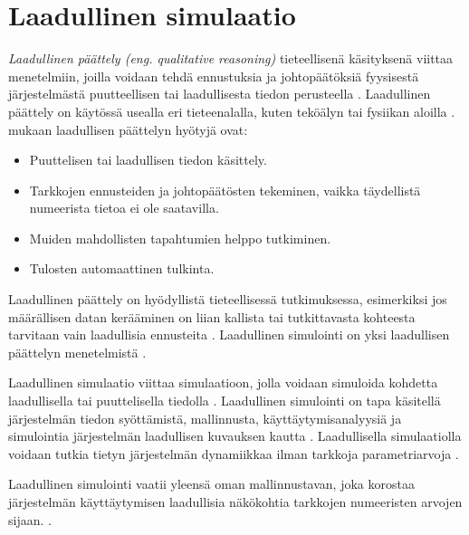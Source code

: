 \documentclass[utf8]{gradu3}
\begin{document}
\section{Laadullinen simulaatio} \label{laadullinen simulaatio}
\textit{Laadullinen päättely (eng. qualitative reasoning)} 
tieteellisenä käsityksenä viittaa menetelmiin, joilla
voidaan tehdä ennustuksia ja johtopäätöksiä fyysisestä järjestelmästä puutteellisen tai laadullisesta tiedon perusteella
\parencite{QualitativeReasoning1997}. 
Laadullinen päättely on käytössä usealla eri tieteenalalla, kuten teköälyn \parencite[luku~35]{qualitativeReasoning2014} tai fysiikan aloilla \parencite{QualitativePhysics1988}.
\textcite{QualitativeReasoning1997} mukaan laadullisen päättelyn hyötyjä ovat:
\begin{itemize}
    \item Puuttelisen tai laadullisen tiedon käsittely.
    \item Tarkkojen ennusteiden ja johtopäätösten tekeminen, 
    vaikka täydellistä numeerista tietoa ei ole saatavilla.
    \item Muiden mahdollisten tapahtumien helppo tutkiminen.
    \item Tulosten automaattinen tulkinta. 
\end{itemize}
Laadullinen päättely on hyödyllistä tieteellisessä tutkimuksessa, esimerkiksi jos 
määrällisen datan kerääminen on liian kallista tai 
tutkittavasta kohteesta tarvitaan vain laadullisia ennusteita
\parencite{QualitativeReasoning1997}.
Laadullinen simulointi on yksi laadullisen päättelyn menetelmistä \parencite{kuipers1986qualitative}. 

Laadullinen simulaatio viittaa simulaatioon, jolla voidaan simuloida kohdetta
laadullisella tai puuttelisella tiedolla \parencite{kuipers1986qualitative}.
Laadullinen simulointi on tapa käsitellä järjestelmän tiedon syöttämistä, 
mallinnusta, käyttäytymisanalyysiä ja simulointia järjestelmän 
laadullisen kuvauksen kautta \parencite{QualSimTheoryApplications2013}.
Laadullisella simulaatiolla voidaan tutkia tietyn järjestelmän dynamiikkaa 
ilman tarkkoja parametriarvoja \parencite{cosme2023history}. 

Laadullinen simulointi vaatii yleensä oman mallinnustavan, 
joka korostaa järjestelmän käyttäytymisen laadullisia näkökohtia 
tarkkojen numeeristen arvojen sijaan. 
%
\parencites%
  {parallelQualitativeSimulation1997}%
  {kuipers1986qualitative}%
\relax.
%
\end{document}

